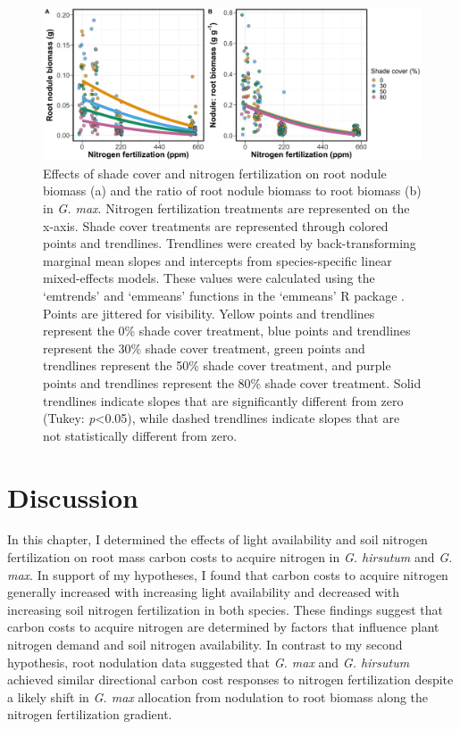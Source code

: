 \newpage
\begin{landscape}

\begin{figure}
    \centering
    \includegraphics[width = \columnwidth]{ch2_LxN_Greenhouse/figs/fig4_nodwgt.jpg}
    \caption[Effects of shade cover and nitrogen fertilization on root nodule biomass and the ratio of root nodule biomass to root biomass in \textit{G. max}.]{Effects of shade cover and nitrogen fertilization on root nodule biomass (a) and the ratio of root nodule biomass to root biomass (b) in \textit{G. max}. Nitrogen fertilization treatments are represented on the x-axis. Shade cover treatments are represented through colored points and trendlines. Trendlines were created by back-transforming marginal mean slopes and intercepts from species-specific linear mixed-effects models. These values were calculated using the ‘emtrends’ and ‘emmeans’ functions in the ‘emmeans’ R package . Points are jittered for visibility. Yellow points and trendlines represent the 0\% shade cover treatment, blue points and trendlines represent the 30\% shade cover treatment, green points and trendlines represent the 50\% shade cover treatment, and purple points and trendlines represent the 80\% shade cover treatment. Solid trendlines indicate slopes that are significantly different from zero (Tukey: \textit{p}<0.05), while dashed trendlines indicate slopes that are not statistically different from zero.}
    \label{fig:figure2.4}
\end{figure}
\end{landscape}
\clearpage

\section{Discussion}
\noindent In this chapter, I determined the effects of light availability and soil nitrogen fertilization on root mass carbon costs to acquire nitrogen in \textit{G. hirsutum} and \textit{G. max}. In support of my hypotheses, I found that carbon costs to acquire nitrogen generally increased with increasing light availability and decreased with increasing soil nitrogen fertilization in both species. These findings suggest that carbon costs to acquire nitrogen are determined by factors that influence plant nitrogen demand and soil nitrogen availability. In contrast to my second hypothesis, root nodulation data suggested that \textit{G. max} and \textit{G. hirsutum} achieved similar directional carbon cost responses to nitrogen fertilization despite a likely shift in \textit{G. max} allocation from nodulation to root biomass along the nitrogen fertilization gradient.

